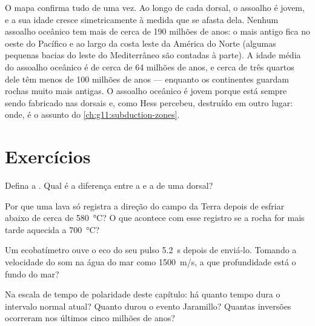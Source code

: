 O mapa confirma tudo de uma vez. Ao longo de cada dorsal, o assoalho é
jovem, e a sua idade cresce simetricamente à medida que se afasta dela.
Nenhum assoalho oceânico tem mais de cerca de \num{190} milhões de anos: o
mais antigo fica no oeste do Pacífico e ao largo da costa leste da América
do Norte (algumas pequenas bacias do leste do Mediterrâneo são contadas à
parte). A idade média do assoalho oceânico é de cerca de \num{64} milhões de
anos, e cerca de três quartos dele têm menos de 100 milhões de anos ---
enquanto os continentes guardam rochas muito mais antigas. O assoalho
oceânico é jovem porque está sempre sendo fabricado nas dorsais e, como Hess
percebeu, destruído em outro lugar: onde, é o assunto do
\cref{ch:g11:subduction-zones}.

\section{Exercícios}

\begin{exercise}[$\star$]\label{exo:g11:drift-to-spreading:1}
Defina a . Qual é a diferença entre a  e a  de uma dorsal?
\end{exercise}

\begin{exercise}[$\star$]\label{exo:g11:drift-to-spreading:2}
Por que uma lava só registra a direção do campo da Terra depois de esfriar
abaixo de cerca de \qty{580}{\celsius}? O que acontece com esse registro se
a rocha for mais tarde aquecida a \qty{700}{\celsius}?
\end{exercise}

\begin{exercise}[$\star$]\label{exo:g11:drift-to-spreading:3}
Um ecobatímetro ouve o eco do seu pulso \qty{5.2}{s} depois de enviá-lo.
Tomando a velocidade do som na água do mar como \qty{1500}{m/s}, a que
profundidade está o fundo do mar?
\end{exercise}

\begin{exercise}[$\star$]\label{exo:g11:drift-to-spreading:4}
Na escala de tempo de polaridade deste capítulo: há quanto tempo dura o
intervalo normal atual? Quanto durou o evento Jaramillo? Quantas inversões
ocorreram nos últimos cinco milhões de anos?
\end{exercise}

